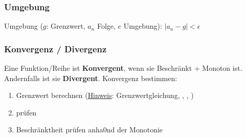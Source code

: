 \subsubsection{Umgebung}
Umgebung ($g$: Grenzwert, $a_n$ Folge, $e$ Umgebung): $\left|a_n - g\right| < \epsilon$


\subsubsection{Konvergenz / Divergenz}
Eine Funktion/Reihe ist \textbf{Konvergent}, wenn sie Beschränkt + Monoton ist. Andernfalls ist sie \textbf{Divergent}.
Konvergenz bestimmen:
\begin{enumerate}[nosep]
	\item Grenzwert berechnen (\underline{Hinweis}: Grenzwertgleichung, , , )
	\item {} prüfen 
	\item Beschränktheit prüfen anha0nd der Monotonie
\end{enumerate}

